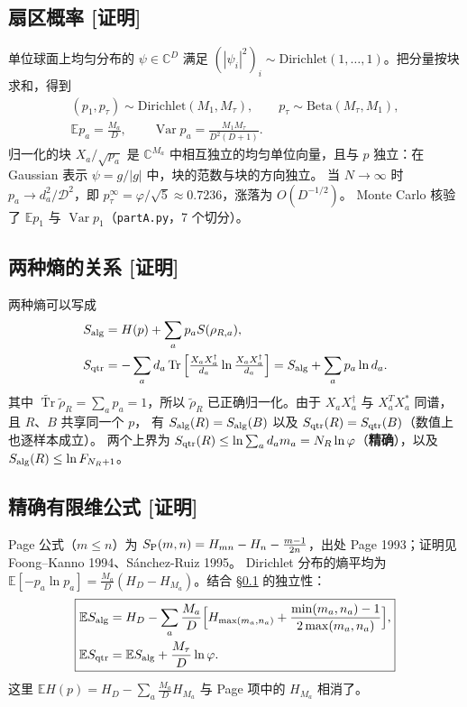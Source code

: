 \documentclass[11pt,a4paper,UTF8]{ctexart}
\newcommand{\Tr}{\operatorname{Tr}}
\newcommand{\tTr}{\widetilde{\operatorname{Tr}}}
\newcommand{\E}{\mathbb{E}}
\newcommand{\Salg}{S_{\rm alg}}
\newcommand{\Sqtr}{S_{\rm qtr}}
\newcommand{\code}[1]{\texttt{#1}}
\newcommand{\tagP}{\texorpdfstring{\textcolor{cP}{\textbf{[证明]}}}{[证明]}}
\begin{document}
\subsection{扇区概率 \tagP}\label{ss:A-prob}
单位球面上均匀分布的 $\psi\in\mathbb C^D$ 满足 $(|\psi_i|^2)_i\sim\mathrm{Dirichlet}(1,\dots,1)$。把分量按块求和，得到
\begin{gather*}
(p_1,p_\tau)\sim\mathrm{Dirichlet}(M_1,M_\tau),\qquad p_\tau\sim\mathrm{Beta}(M_\tau,M_1),\\
\E p_a=\frac{M_a}{D},\qquad \operatorname{Var}p_a=\frac{M_1M_\tau}{D^2(D+1)}.
\end{gather*}
归一化的块 $X_a/\sqrt{p_a}$ 是 $\mathbb C^{M_a}$ 中相互独立的均匀单位向量，且与 $p$ 独立：在 Gaussian 表示 $\psi=g/|g|$ 中，块的范数与块的方向独立。
当 $N\to\infty$ 时 $p_a\to d_a^2/\mathcal D^2$，即 $p_\tau^\infty=\varphi/\sqrt5\approx0.7236$，涨落为 $O(D^{-1/2})$。
Monte Carlo 核验了 $\E p_1$ 与 $\operatorname{Var}p_1$（\code{partA.py}，7 个切分）。

\subsection{两种熵的关系 \tagP}\label{ss:A-rel}
两种熵可以写成
\begin{align*}
\Salg&=H(p)+\sum_ap_aS(\rho_{R,a}),\\
\Sqtr&=-\sum_ad_a\Tr\Big[\tfrac{X_aX_a^\dagger}{d_a}\ln\tfrac{X_aX_a^\dagger}{d_a}\Big]=\Salg+\sum_ap_a\ln d_a .
\end{align*}
其中 $\tTr\widetilde\rho_R=\sum_ap_a=1$，所以 $\widetilde\rho_R$ 已正确归一化。由于 $X_aX_a^\dagger$ 与 $X_a^TX_a^{*}$ 同谱，且 $R$、$B$ 共享同一个 $p$，
有 $\Salg(R)=\Salg(B)$ 以及 $\Sqtr(R)=\Sqtr(B)$（数值上也逐样本成立）。
两个上界为 $\Sqtr(R)\le\ln\sum_ad_am_a=N_R\ln\varphi$（\textbf{精确}），以及 $\Salg(R)\le\ln F_{N_R+1}$。

\subsection{精确有限维公式 \tagP}\label{ss:A-exact}
Page 公式（$m\le n$）为 $S_{\rm P}(m,n)=H_{mn}-H_n-\frac{m-1}{2n}$，出处 Page 1993；证明见 Foong--Kanno 1994、Sánchez-Ruiz 1995。
Dirichlet 分布的熵平均为 $\E[-p_a\ln p_a]=\frac{M_a}{D}(H_D-H_{M_a})$。结合 \S\ref{ss:A-prob} 的独立性：
\[
\boxed{\begin{aligned}
\E\Salg&=H_D-\sum_a\frac{M_a}{D}\Big[H_{\max(m_a,n_a)}+\frac{\min(m_a,n_a)-1}{2\max(m_a,n_a)}\Big],\\
\E\Sqtr&=\E\Salg+\frac{M_\tau}{D}\ln\varphi .
\end{aligned}}
\]
这里 $\E H(p)=H_D-\sum_a\frac{M_a}{D}H_{M_a}$ 与 Page 项中的 $H_{M_a}$ 相消了。
\end{document}
